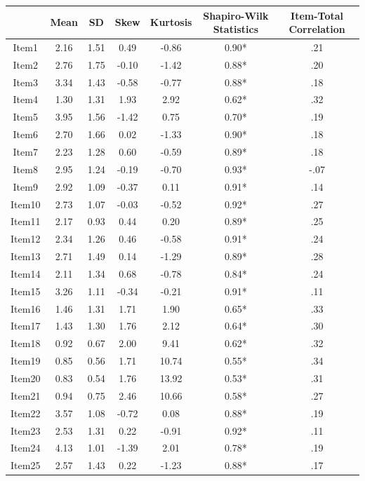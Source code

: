 \begin{appendix}
\begin{table}[h]
\begin{center}
\begin{threeparttable}
\begin{tabular}{ccccccc}
\toprule
 & \multicolumn{1}{c}{Mean} & \multicolumn{1}{c}{SD} & \multicolumn{1}{c}{Skew} & \multicolumn{1}{c}{Kurtosis} & \multicolumn{1}{c}{Shapiro-Wilk Statistics} & \multicolumn{1}{c}{Item-Total Correlation}\\
\midrule
Item1 & 2.16 & 1.51 & 0.49 & -0.86 & 0.90* & .21\\
Item2 & 2.76 & 1.75 & -0.10 & -1.42 & 0.88* & .20\\
Item3 & 3.34 & 1.43 & -0.58 & -0.77 & 0.88* & .18\\
Item4 & 1.30 & 1.31 & 1.93 & 2.92 & 0.62* & .32\\
Item5 & 3.95 & 1.56 & -1.42 & 0.75 & 0.70* & .19\\
Item6 & 2.70 & 1.66 & 0.02 & -1.33 & 0.90* & .18\\
Item7 & 2.23 & 1.28 & 0.60 & -0.59 & 0.89* & .18\\
Item8 & 2.95 & 1.24 & -0.19 & -0.70 & 0.93* & -.07\\
Item9 & 2.92 & 1.09 & -0.37 & 0.11 & 0.91* & .14\\
Item10 & 2.73 & 1.07 & -0.03 & -0.52 & 0.92* & .27\\
Item11 & 2.17 & 0.93 & 0.44 & 0.20 & 0.89* & .25\\
Item12 & 2.34 & 1.26 & 0.46 & -0.58 & 0.91* & .24\\
Item13 & 2.71 & 1.49 & 0.14 & -1.29 & 0.89* & .28\\
Item14 & 2.11 & 1.34 & 0.68 & -0.78 & 0.84* & .24\\
Item15 & 3.26 & 1.11 & -0.34 & -0.21 & 0.91* & .11\\
Item16 & 1.46 & 1.31 & 1.71 & 1.90 & 0.65* & .33\\
Item17 & 1.43 & 1.30 & 1.76 & 2.12 & 0.64* & .30\\
Item18 & 0.92 & 0.67 & 2.00 & 9.41 & 0.62* & .32\\
Item19 & 0.85 & 0.56 & 1.71 & 10.74 & 0.55* & .34\\
Item20 & 0.83 & 0.54 & 1.76 & 13.92 & 0.53* & .31\\
Item21 & 0.94 & 0.75 & 2.46 & 10.66 & 0.58* & .27\\
Item22 & 3.57 & 1.08 & -0.72 & 0.08 & 0.88* & .19\\
Item23 & 2.53 & 1.31 & 0.22 & -0.91 & 0.92* & .11\\
Item24 & 4.13 & 1.01 & -1.39 & 2.01 & 0.78* & .19\\
Item25 & 2.57 & 1.43 & 0.22 & -1.23 & 0.88* & .17\\

\end{tabular}
\end{threeparttable}
\end{center}
\end{table}
\end{appendix}
